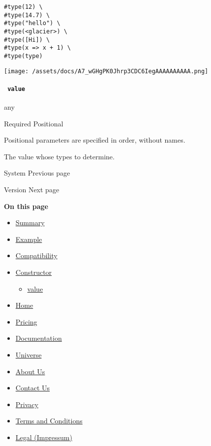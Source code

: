 \begin{verbatim}
#type(12) \
#type(14.7) \
#type("hello") \
#type(<glacier>) \
#type([Hi]) \
#type(x => x + 1) \
#type(type)
\end{verbatim}

\texttt{[image: /assets/docs/A7\_wGHgPK0Jhrp3CDC6IegAAAAAAAAAA.png]}

\paragraph{\texorpdfstring{\texttt{\ value\ }}{ value }}\label{constructor-value}

{ any }

{Required} {{ Positional }}

\phantomsection\label{constructor-value-positional-tooltip}
Positional parameters are specified in order, without names.

The value whose type\textquotesingle s to determine.

\href{/docs/reference/foundations/sys/}{\pandocbounded{}}

{ System } { Previous page }

\href{/docs/reference/foundations/version/}{\pandocbounded{}}

{ Version } { Next page }

\textbf{On this page}

\begin{itemize}
\tightlist
\item
  \hyperref[summary]{Summary}
\item
  \hyperref[example]{Example}
\item
  \hyperref[compatibility]{Compatibility}
\item
  \hyperref[constructor]{Constructor}

  \begin{itemize}
  \tightlist
  \item
    \hyperref[constructor-value]{value}
  \end{itemize}
\end{itemize}

\begin{itemize}
\tightlist
\item
  \href{/}{Home}
\item
  \href{/pricing/}{Pricing}
\item
  \href{/docs/}{Documentation}
\item
  \href{/universe/}{Universe}
\item
  \href{/about/}{About Us}
\item
  \href{/contact/}{Contact Us}
\item
  \href{/privacy/}{Privacy}
\item
  \href{https://typst.app/terms}{Terms and Conditions}
\item
  \href{/legal/}{Legal (Impressum)}
\end{itemize}

